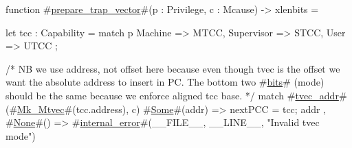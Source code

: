 function #\hyperref[sailRISCVzpreparezytrapzyvector]{prepare\_trap\_vector}#(p : Privilege, c : Mcause) -> xlenbits = {
  let tcc : Capability = match p {
                           Machine    => MTCC,
                           Supervisor => STCC,
                           User       => UTCC
                         };

  /* NB we use address, not offset here because even though tvec is the offset
     we want the absolute address to insert in PC. The bottom two #\hyperref[sailRISCVzbits]{bits}# (mode) should 
     be the same because we enforce aligned tcc base. */
  match #\hyperref[sailRISCVztveczyaddr]{tvec\_addr}#(#\hyperref[sailRISCVzMkzyMtvec]{Mk\_Mtvec}#(tcc.address), c) { 
    #\hyperref[sailRISCVzSome]{Some}#(addr) => { nextPCC = tcc; addr },
    #\hyperref[sailRISCVzNone]{None}#()     => #\hyperref[sailRISCVzinternalzyerror]{internal\_error}#(__FILE__, __LINE__, "Invalid tvec mode")
  }
}
